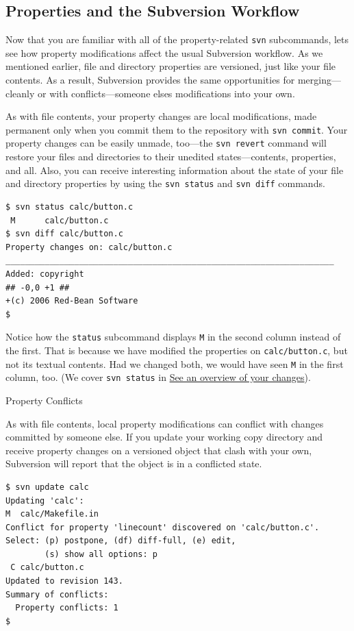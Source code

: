 \subsection{Properties and the Subversion
Workflow}\label{svn.advanced.props.workflow}

Now that you are familiar with all of the property-related \texttt{svn}
subcommands, let\textquotesingle s see how property modifications affect
the usual Subversion workflow. As we mentioned earlier, file and
directory properties are versioned, just like your file contents. As a
result, Subversion provides the same opportunities for merging---cleanly
or with conflicts---someone else\textquotesingle s modifications into
your own.

As with file contents, your property changes are local modifications,
made permanent only when you commit them to the repository with
\texttt{svn\ commit}. Your property changes can be easily unmade,
too---the \texttt{svn\ revert} command will restore your files and
directories to their unedited states---contents, properties, and all.
Also, you can receive interesting information about the state of your
file and directory properties by using the \texttt{svn\ status} and
\texttt{svn\ diff} commands.

\begin{verbatim}
$ svn status calc/button.c
 M      calc/button.c
$ svn diff calc/button.c
Property changes on: calc/button.c
___________________________________________________________________
Added: copyright
## -0,0 +1 ##
+(c) 2006 Red-Bean Software
$
\end{verbatim}

Notice how the \texttt{status} subcommand displays \texttt{M} in the
second column instead of the first. That is because we have modified the
properties on \texttt{calc/button.c}, but not its textual contents. Had
we changed both, we would have seen \texttt{M} in the first column, too.
(We cover \texttt{svn\ status} in
\hyperref[svn.tour.cycle.examine.status]{See an overview of your
changes}).

Property Conflicts

As with file contents, local property modifications can conflict with
changes committed by someone else. If you update your working copy
directory and receive property changes on a versioned object that clash
with your own, Subversion will report that the object is in a conflicted
state.

\begin{verbatim}
$ svn update calc
Updating 'calc':
M  calc/Makefile.in
Conflict for property 'linecount' discovered on 'calc/button.c'.
Select: (p) postpone, (df) diff-full, (e) edit,
        (s) show all options: p
 C calc/button.c
Updated to revision 143.
Summary of conflicts:
  Property conflicts: 1
$ 
\end{verbatim}


